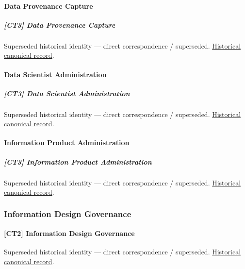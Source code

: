 \paragraph{Data Provenance Capture}

\subparagraph{[CT3] Data Provenance Capture}

\par\label{element:61258c7fe41f4541871a67ec9d7185cf}
Superseded historical identity — direct correspondence / superseded. \href{../../../../continuum/strategy/capability/61258c7fe41f4541871a67ec9d7185cf.md}{Historical canonical record}.\par

\paragraph{Data Scientist Administration}

\subparagraph{[CT3] Data Scientist Administration}

\par\label{element:1cb497aec93c4b82ba7f5b622813e54e}
Superseded historical identity — direct correspondence / superseded. \href{../../../../continuum/strategy/capability/1cb497aec93c4b82ba7f5b622813e54e.md}{Historical canonical record}.\par

\paragraph{Information Product Administration}

\subparagraph{[CT3] Information Product Administration}

\par\label{element:5d9b7f8d2d7b41759b6d4931c1d2aaa2}
Superseded historical identity — direct correspondence / superseded. \href{../../../../continuum/strategy/capability/5d9b7f8d2d7b41759b6d4931c1d2aaa2.md}{Historical canonical record}.\par

\subsubsection{Information Design Governance}

\paragraph{[CT2] Information Design Governance}

\par\label{element:0bdd7f8c0cd74d9fabc49801af037fc2}
Superseded historical identity — direct correspondence / superseded. \href{../../../../continuum/strategy/capability/0bdd7f8c0cd74d9fabc49801af037fc2.md}{Historical canonical record}.\par

